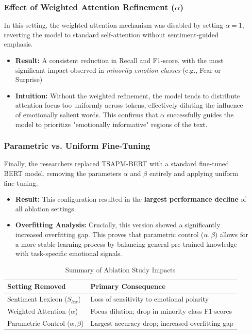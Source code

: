 \documentclass[a4paper,12pt]{article}
\begin{document}
\subsubsection{Effect of Weighted Attention Refinement ($\alpha$)}
In this setting, the weighted attention mechanism was disabled by setting $\alpha = 1$, reverting the model to standard self-attention without sentiment-guided emphasis.

\begin{itemize}
    \item \textbf{Result:} A consistent reduction in Recall and F1-score, with the most significant impact observed in \textit{minority emotion classes} (e.g., Fear or Surprise)
    \item \textbf{Intuition:} Without the weighted refinement, the model tends to distribute attention focus too uniformly across tokens, effectively diluting the influence of emotionally salient words. This confirms that $\alpha$ successfully guides the model to prioritize "emotionally informative" regions of the text.
\end{itemize}

\subsubsection{Parametric vs. Uniform Fine-Tuning}
Finally, the researchers replaced TSAPM-BERT with a standard fine-tuned BERT model, removing the parameters $\alpha$ and $\beta$ entirely and applying uniform fine-tuning.

\begin{itemize}
    \item \textbf{Result:} This configuration resulted in the \textbf{largest performance decline} of all ablation settings.
    \item \textbf{Overfitting Analysis:} Crucially, this version showed a significantly increased overfitting gap. This proves that parametric control ($\alpha, \beta$) allows for a more stable learning process by balancing general pre-trained knowledge with task-specific emotional signals.
\end{itemize}

\begin{table}[h]
\centering
\caption{Summary of Ablation Study Impacts}
\label{tab:ablation}
\begin{tabular}{|l|l|}
\hline
\textbf{Setting Removed} & \textbf{Primary Consequence} \\ \hline
Sentiment Lexicon ($S_{lex}$) & Loss of sensitivity to emotional polarity  \\ \hline
Weighted Attention ($\alpha$) & Focus dilution; drop in minority class F1-scores \\ \hline
Parametric Control ($\alpha, \beta$) & Largest accuracy drop; increased overfitting gap \\ \hline
\end{tabular}
\end{table}
\end{document}
